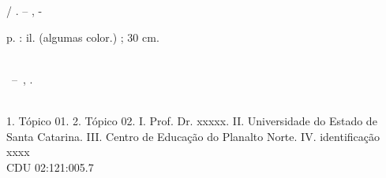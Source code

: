 \imprimircapa

\imprimirfolhaderosto*

%     

\begin{fichacatalografica}
	\vspace*{\fill}					%
	\begin{center}					%
	\begin{minipage}[c]{12.5cm}		%
	
	\imprimirautor
	
	\hspace{0.5cm} \imprimirtitulo  / \imprimirautor. --
	\imprimirlocal, \imprimirdata-
	
	\hspace{0.5cm} \pageref{LastPage} p. : il. (algumas color.) ; 30 cm.\\
	
	\hspace{0.5cm} \imprimirorientadorRotulo~\imprimirorientador\\
	
	\hspace{0.5cm}
	\parbox[t]{\textwidth}{\imprimirtipotrabalho~--~\imprimirinstituicao,
	\imprimirdata.}\\
	
	\hspace{0.5cm}
		1. Tópico 01.
		2. Tópico 02.
		I. Prof. Dr. xxxxx.
		II. Universidade do Estado de Santa Catarina.
		III. Centro de Educação do Planalto Norte.
		IV. identificação xxxx\\ 			
	
	\hspace{8.75cm} CDU 02:121:005.7\\
	
	\end{minipage}
	\end{center}
\end{fichacatalografica}

